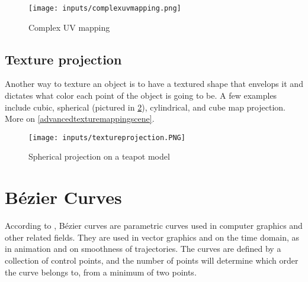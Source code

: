 \documentclass[cic,tc,english]{iiufrgs}
\begin{document}
\begin{figure}[h!]
    \caption{Complex UV mapping}
    \begin{center}
        \texttt{[image: inputs/complexuvmapping.png]}
    \end{center}
    \label{complexuvmapping}
\end{figure}

\subsection{Texture projection}
Another way to texture an object is to have a textured shape that envelops it and dictates what color each point of the object is going to be. A few examples include cubic, spherical (pictured in  \cref{sphericalprojection}), cylindrical, and cube map projection. More on \cref{advancedtexturemappingscene}.

\begin{figure}[h!]
    \caption{Spherical projection on a teapot model}
    \begin{center}
        \texttt{[image: inputs/textureprojection.PNG]}
    \end{center}
    \label{sphericalprojection}
\end{figure}

\section{Bézier Curves}
\label{beziercurveschapter}
According to \citet{Mortenson1999mathcomputergraphics}, Bézier curves are parametric curves used in computer graphics and other related fields. They are used in vector graphics and on the time domain, as in animation and on smoothness of trajectories. The curves are defined by a collection of control points, and the number of points will determine which order the curve belongs to, from a minimum of two points.
\end{document}
